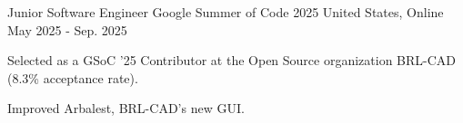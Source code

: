 

\begin{cventries}

  \cventry
    {Junior Software Engineer} %
    {Google Summer of Code 2025} %
    {United States, Online} %
    {May 2025 - Sep. 2025} %
    {
      \begin{cvitems} %
        \item {Selected as a GSoC '25 Contributor at the Open Source organization BRL-CAD (8.3\% acceptance rate).}
        \item {Improved Arbalest, BRL-CAD's new GUI.}
      \end{cvitems}
    }

\end{cventries}

